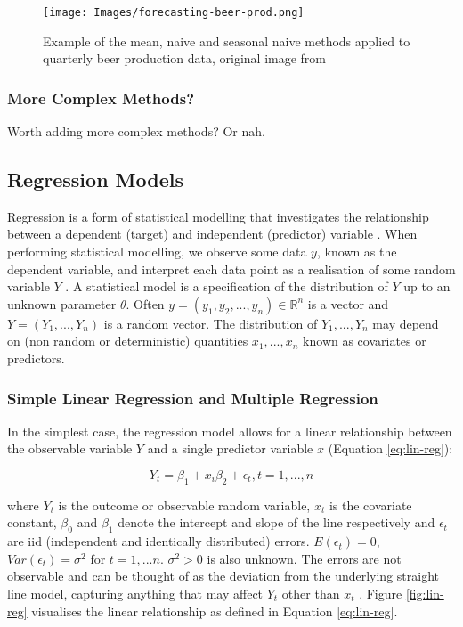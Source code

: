 \documentclass[12pt, a4paper]{article}
\begin{document}
\begin{figure}[H]
\begin{center}
    \texttt{[image: Images/forecasting-beer-prod.png]}
    \caption{Example of the mean, naive and seasonal naive methods applied to quarterly beer production data, original image from \cite{forecasting-book}}
    \label{fig:forecasting}
\end{center}
\end{figure}

\subsubsection{More Complex Methods?}

Worth adding more complex methods? Or nah. 

\subsection{Regression Models}
\label{regression-models}

Regression is a form of statistical modelling that investigates the relationship between a dependent (target) and independent (predictor) variable \cite{regression-techniques}. When performing statistical modelling, we observe some data $y$, known as the dependent variable, and interpret each data point as a realisation of some random variable $Y$ \cite{m2s2-notes}. A statistical model is a specification of the distribution of $Y$ up to an unknown parameter $\theta$. Often $y = (y_1, y_2, ..., y_n) \in \mathbb{R} ^ n$ is a vector and $Y = (Y_1, ..., Y_n)$ is a random vector. The distribution of $Y_1, ..., Y_n$ may depend on (non random or deterministic) quantities $x_1, ..., x_n$ known as covariates or predictors. 

\subsubsection{Simple Linear Regression and Multiple Regression}

In the simplest case, the regression model allows for a linear relationship between the observable variable $Y$ and a single predictor variable $x$ (Equation \ref{eq:lin-reg}): 

\begin{equation}
    Y_t = \beta_1 + x_i\beta_2 + \epsilon_t, t = 1, ..., n
    \label{eq:lin-reg}
\end{equation}

where $Y_t$ is the outcome or observable random variable, $x_t$ is the covariate constant, $\beta_0$ and $\beta_1$ denote the intercept and slope of the line respectively and $\epsilon_t$ are iid (independent and identically distributed) errors. $E(\epsilon_t) = 0$, $Var(\epsilon_t) = \sigma^2$ for $t = 1,...n$. $\sigma^2 > 0$ is also unknown. The errors are not observable and can be thought of as the deviation from the underlying straight line model, capturing anything that may affect $Y_t$ other than $x_t$ \cite{forecasting-book}. Figure \ref{fig:lin-reg} visualises the linear relationship as defined in Equation \ref{eq:lin-reg}.
\end{document}
